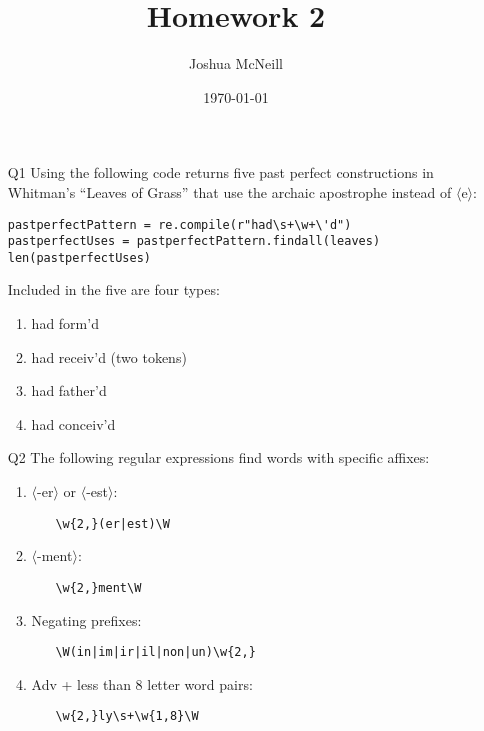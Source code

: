 \documentclass{article}
\title{Homework 2}
\author{Joshua McNeill}
\date{\today}
\newcommand{\orth}[1]{$\langle$#1$\rangle$}
\begin{document}
  \maketitle
  \begin{itemize}
    \item[Q1] Using the following code returns five past perfect constructions in Whitman's ``Leaves of Grass'' that use the archaic apostrophe instead of \orth{e}:
                \begin{lstlisting}
pastperfectPattern = re.compile(r"had\s+\w+\'d")
pastperfectUses = pastperfectPattern.findall(leaves)
len(pastperfectUses)
                \end{lstlisting}
              Included in the five are four types:
                \begin{enumerate}
                  \item had form'd
                  \item had receiv'd (two tokens)
                  \item had father'd
                  \item had conceiv'd
                \end{enumerate}
    \item[Q2] The following regular expressions find words with specific affixes:
      \begin{enumerate}
        \item \orth{-er} or \orth{-est}:
          \begin{itemize}
            \item[] \lstinline!\w{2,}(er|est)\W!
          \end{itemize}
        \item \orth{-ment}:
          \begin{itemize}
            \item[] \lstinline!\w{2,}ment\W!
          \end{itemize}
        \item Negating prefixes:
          \begin{itemize}
            \item[] \lstinline!\W(in|im|ir|il|non|un)\w{2,}!
          \end{itemize}
        \item Adv + less than 8 letter word pairs:
          \begin{itemize}
            \item[] \lstinline!\w{2,}ly\s+\w{1,8}\W!
          \end{itemize}

\end{enumerate}
\end{itemize}
\end{document}
